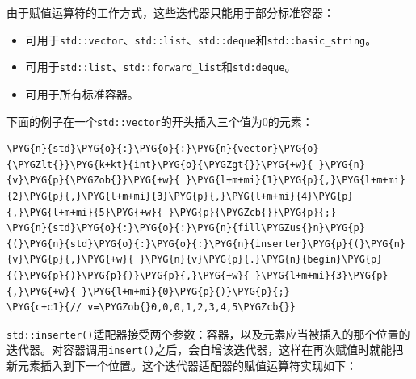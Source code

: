 由于赋值运算符的工作方式，这些迭代器只能用于部分标准容器：



\begin{itemize}
\item {}可用于\texttt{std::\allowbreak{}vector}、\texttt{std::\allowbreak{}list}、\texttt{std::\allowbreak{}deque}和\texttt{std::\allowbreak{}basic\_\allowbreak{}string}。



\item {}可用于\texttt{std::\allowbreak{}list}、\texttt{std::\allowbreak{}forward\_\allowbreak{}list}和\texttt{std:\allowbreak{}deque}。



\item {}可用于所有标准容器。

\end{itemize}



下面的例子在一个\texttt{std::\allowbreak{}vector}的开头插入三个值为0的元素：



\begin{codeblockbg}
\begin{Verbatim}[commandchars=\\\{\},breaklines=true,breakanywhere=true,fontsize=\codefont,xleftmargin=17bp]
\PYG{n}{std}\PYG{o}{:}\PYG{o}{:}\PYG{n}{vector}\PYG{o}{\PYGZlt{}}\PYG{k+kt}{int}\PYG{o}{\PYGZgt{}}\PYG{+w}{ }\PYG{n}{v}\PYG{p}{\PYGZob{}}\PYG{+w}{ }\PYG{l+m+mi}{1}\PYG{p}{,}\PYG{l+m+mi}{2}\PYG{p}{,}\PYG{l+m+mi}{3}\PYG{p}{,}\PYG{l+m+mi}{4}\PYG{p}{,}\PYG{l+m+mi}{5}\PYG{+w}{ }\PYG{p}{\PYGZcb{}}\PYG{p}{;}
\PYG{n}{std}\PYG{o}{:}\PYG{o}{:}\PYG{n}{fill\PYGZus{}n}\PYG{p}{(}\PYG{n}{std}\PYG{o}{:}\PYG{o}{:}\PYG{n}{inserter}\PYG{p}{(}\PYG{n}{v}\PYG{p}{,}\PYG{+w}{ }\PYG{n}{v}\PYG{p}{.}\PYG{n}{begin}\PYG{p}{(}\PYG{p}{)}\PYG{p}{)}\PYG{p}{,}\PYG{+w}{ }\PYG{l+m+mi}{3}\PYG{p}{,}\PYG{+w}{ }\PYG{l+m+mi}{0}\PYG{p}{)}\PYG{p}{;}
\PYG{c+c1}{// v=\PYGZob{}0,0,0,1,2,3,4,5\PYGZcb{}}
\end{Verbatim}
\end{codeblockbg}



\texttt{std::\allowbreak{}inserter()}适配器接受两个参数：容器，以及元素应当被插入的那个位置的迭代器。对容器调用\texttt{insert()}之后，会自增该迭代器，这样在再次赋值时就能把新元素插入到下一个位置。这个迭代器适配器的赋值运算符实现如下：


